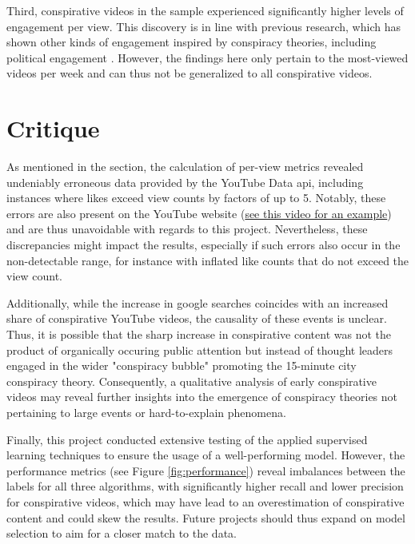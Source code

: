 \documentclass[fontsize=11pt, parskip=half]{scrartcl}
\begin{document}
    Third, conspirative videos in the sample experienced significantly higher levels of engagement per view. This discovery is in line with previous research, which has shown other kinds of engagement inspired by conspiracy theories, including political engagement \parencite{kimHowConspiracyTheories2022}. However, the findings here only pertain to the most-viewed videos per week and can thus not be generalized to all conspirative videos. 

\section{Critique}
\label{section:critique}

    As mentioned in the  section, the calculation of per-view metrics revealed undeniably erroneous data provided by the YouTube Data api, including instances where likes exceed view counts by factors of up to 5. Notably, these errors are also present on the YouTube website (\href{https://www.youtube.com/watch?v=XVKdKDHH7UE}{see this video for an example}) and are thus unavoidable with regards to this project. Nevertheless, these discrepancies might impact the results, especially if such errors also occur in the non-detectable range, for instance with inflated like counts that do not exceed the view count.

    Additionally, while the increase in google searches coincides with an increased share of conspirative YouTube videos, the causality of these events is unclear. Thus, it is possible that the sharp increase in conspirative content was not the product of organically occuring public attention but instead of thought leaders engaged in the wider "conspiracy bubble" promoting the 15-minute city conspiracy theory. Consequently, a qualitative analysis of early conspirative videos may reveal further insights into the emergence of conspiracy theories not pertaining to large events or hard-to-explain phenomena.

    Finally, this project conducted extensive testing of the applied supervised learning techniques to ensure the usage of a well-performing model. However, the performance metrics (see Figure \ref{fig:performance}) reveal imbalances between the labels for all three algorithms, with significantly higher recall and lower precision for conspirative videos, which may have lead to an overestimation of conspirative content and could skew the results. Future projects should thus expand on model selection to aim for a closer match to the data.    

\newpage

\onecolumn
\begin{minipage}[t]{\textwidth}
    \printbibliography[heading=bibintoc, title={References}]
\end{minipage}
\end{document}
